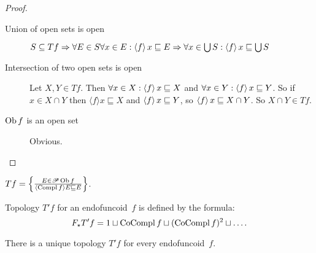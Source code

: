 \begin{proof}
  
  \begin{description}
    \item[Union of open sets is open] $S \subseteq T f \Rightarrow \forall E
    \in S \forall x \in E : \left\langle f\right\rangle x \sqsubseteq E \Rightarrow
    \forall x \in \bigcup S : \left\langle f\right\rangle x \sqsubseteq \bigcup S$
    
    \item[Intersection of two open sets is open] Let $X, Y \in T f$. Then
    $\forall x \in X : \left\langle f\right\rangle x \sqsubseteq X$ and $\forall x \in Y
    : \left\langle f\right\rangle x \sqsubseteq Y$. So if $x \in X \cap Y$ then $\langle
    f \rangle x \sqsubseteq X$ and $\left\langle f\right\rangle x \sqsubseteq Y$, so
    $\left\langle f\right\rangle x \sqsubseteq X \cap Y$. So $X \cap Y \in T f$.
    
    \item[$\operatorname{Ob} f$ is an open set] Obvious.
  \end{description}
\end{proof}

\begin{obvious}
$T f = \left\{ \frac{ E \in \mathscr{P} \operatorname{Ob} f }{ \langle
\operatorname{Compl} f \rangle E \sqsubseteq E }\right\}$.
\end{obvious}

\begin{defn}
Topology $T'f$ for an endofuncoid~$f$ is defined by the formula:
\[
F_{\star} T' f =
1 \sqcup \operatorname{CoCompl} f \sqcup (\operatorname{CoCompl} f)^2 \sqcup \ldots.
\]
\end{defn}

\begin{prop}
There is a unique topology $T'f$ for every endofuncoid~$f$.
\end{prop}

